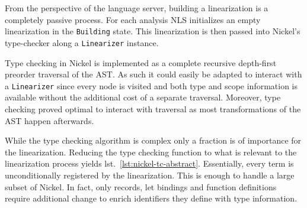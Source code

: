 \documentclass[
  a4paper,
  bibtex,
  english,
  nomenclature]{kthlatex/kththesis/kththesis}
\begin{document}
From the perspective of the language server, building a linearization is
a completely passive process. For each analysis NLS initializes an empty
linearization in the \texttt{Building} state. This linearization is then
passed into Nickel's type-checker along a \texttt{Linearizer} instance.

Type checking in Nickel is implemented as a complete recursive
depth-first preorder traversal of the AST. As such it could easily be
adapted to interact with a \texttt{Linearizer} since every node is
visited and both type and scope information is available without the
additional cost of a separate traversal. Moreover, type checking proved
optimal to interact with traversal as most transformations of the AST
happen afterwards.

While the type checking algorithm is complex only a fraction is of
importance for the linearization. Reducing the type checking function to
what is relevant to the linearization process yields
lst.~\ref{lst:nickel-tc-abstract}. Essentially, every term is
unconditionally registered by the linearization. This is enough to
handle a large subset of Nickel. In fact, only records, let bindings and
function definitions require additional change to enrich identifiers
they define with type information.
\end{document}
